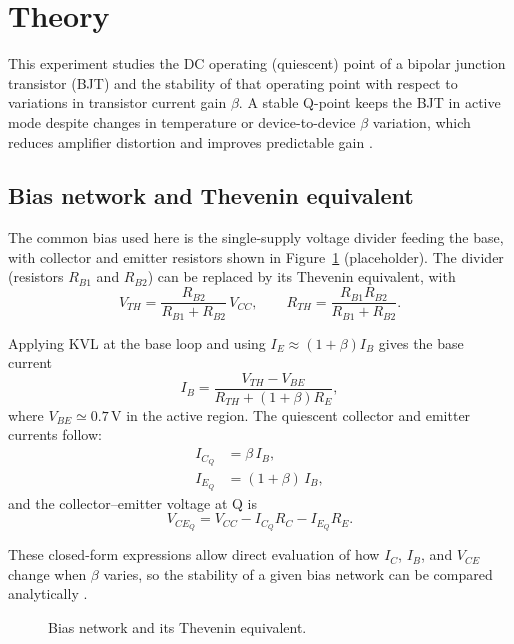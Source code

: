\section{Theory}

This experiment studies the DC operating (quiescent) point of a bipolar junction transistor (BJT) and the stability
of that operating point with respect to variations in transistor current gain $\beta$. A stable Q-point keeps the BJT in
active mode despite changes in temperature or device-to-device $\beta$ variation, which reduces amplifier distortion
and improves predictable gain \cite{boylestad2007,sedra1991}.

\subsection{Bias network and Thevenin equivalent}
The common bias used here is the single-supply voltage divider feeding the base, with collector and emitter resistors
shown in Figure~\ref{lab07_fig:bias_circuit} (placeholder). The divider (resistors $R_{B1}$ and $R_{B2}$) can be
replaced by its Thevenin equivalent, with
\begin{equation}
  V_{TH}=\frac{R_{B2}}{R_{B1}+R_{B2}}\,V_{CC},\qquad R_{TH}=\frac{R_{B1}R_{B2}}{R_{B1}+R_{B2}}.
\end{equation}

Applying KVL at the base loop and using $I_E\approx(1+\beta)I_B$ gives the base current
\begin{equation}
  I_B=\dfrac{V_{TH}-V_{BE}}{R_{TH}+(1+\beta)R_E},
\end{equation}
where $V_{BE}\simeq0.7\,$V in the active region. The quiescent collector and emitter currents follow:
\begin{align}
  I_{C_Q} & =\beta\,I_B,     \\
  I_{E_Q} & =(1+\beta)\,I_B,
\end{align}
and the collector–emitter voltage at Q is
\begin{equation}
  V_{CE_Q}=V_{CC}-I_{C_Q}R_C-I_{E_Q}R_E.
\end{equation}

These closed-form expressions allow direct evaluation of how $I_C$, $I_B$, and $V_{CE}$ change when $\beta$
varies, so the stability of a given bias network can be compared analytically \cite{keown2001}.

\begin{figure}[H]
  \centering
  \caption{Bias network and its Thevenin equivalent.}
  \label{lab07_fig:bias_circuit}
\end{figure}

